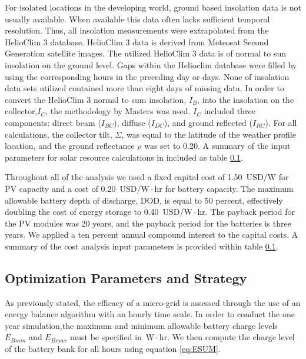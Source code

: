 \documentclass{article}
\newcommand{\unit}[1]{\ensuremath{\, \mathrm{#1}}}
\begin{document}
% 
For isolated locations in the developing world, ground based insolation data is not usually available. 
When available this data often lacks sufficient temporal resolution. 
Thus, all insolation measurements were extrapolated from the HelioClim 3 database.
HelioClim 3 data is derived from Meteosat Second Generation satellite images.
The utilized HelioClim 3 data is of normal to sun insolation on the ground level.
Gaps within the Helioclim database were filled by using the corresponding hours in the preceding day or days.
None of insolation data sets utilized contained more than eight days of missing data.
In order to convert the HelioClim 3 normal to sum insolation, $I_B$, into the insolation on the collector,$I_C$, the methodology by Masters \cite{} was used. 
$I_C$ included three components: direct beam ($I_{BC}$), diffuse ($I_{DC}$), and ground reflected ($I_{RC}$).
For all calculations, the collector tilt, $\Sigma$, was equal to the latitude of the weather profile location, and the ground reflectance $\rho$ was set to 0.20.
A summary of the input parameters for solar resource calculations in included as table \ref{}.

Throughout all of the analysis we used a fixed capital cost of 1.50 \unit{USD/W} for PV capacity and a cost of 0.20 \unit{USD/W \! \cdot \! hr} for battery capacity.
The maximum allowable battery depth of discharge, DOD, is equal to 50 percent, effectively doubling the cost of energy storage to 0.40 \unit{USD/W \! \cdot \! hr}. 
The payback period for the PV modules was 20 years, and the payback period for the batteries is three years. 
We applied a ten percent annual compound interest to the capital costs. 
A summary of the cost analysis input parameters is provided within table \ref{}.

\subsection{Optimization Parameters and Strategy}

As previously stated, the efficacy of a micro-grid is assessed through the use of an energy balance algorithm with an hourly time scale. 
In order to conduct the one year simulation,the maximum and minimum allowable battery charge levels $E_{Bmin}$ and $E_{Bmax}$ must be specified in \unit{W\! \cdot \! hr}.
We then compute the charge level of the battery bank for all hours using equation \ref{eq:ESUM}. 
\end{document}
